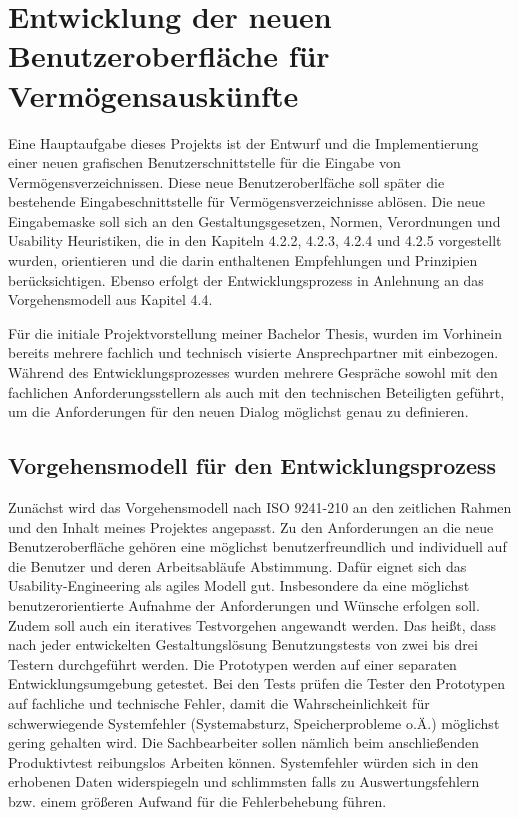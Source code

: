 \section{Entwicklung der neuen Benutzeroberfläche für Vermögensauskünfte}
Eine Hauptaufgabe dieses Projekts ist der Entwurf und die Implementierung einer neuen grafischen Benutzerschnittstelle für die Eingabe von Vermögensverzeichnissen. Diese neue Benutzeroberlfäche soll später die bestehende Eingabeschnittstelle für Vermögensverzeichnisse ablösen. Die neue Eingabemaske soll sich an den Gestaltungsgesetzen, Normen, Verordnungen und Usability Heuristiken, die in den Kapiteln 4.2.2, 4.2.3, 4.2.4 und 4.2.5 vorgestellt wurden, orientieren und die darin enthaltenen Empfehlungen und Prinzipien berücksichtigen. Ebenso erfolgt der Entwicklungsprozess in Anlehnung an das Vorgehensmodell aus Kapitel 4.4. 

Für die initiale Projektvorstellung meiner Bachelor Thesis, wurden im Vorhinein bereits mehrere fachlich und technisch visierte Ansprechpartner mit einbezogen. Während des Entwicklungsprozesses wurden mehrere Gespräche sowohl mit den fachlichen Anforderungsstellern als auch mit den technischen Beteiligten geführt, um die Anforderungen für den neuen Dialog möglichst genau zu definieren.


\subsection{Vorgehensmodell für den Entwicklungsprozess}

Zunächst wird das Vorgehensmodell nach ISO 9241-210 an den zeitlichen Rahmen und den Inhalt meines Projektes angepasst. Zu den Anforderungen an die neue Benutzeroberfläche gehören eine möglichst benutzerfreundlich und individuell auf die Benutzer und deren Arbeitsabläufe Abstimmung. Dafür eignet sich das Usability-Engineering als agiles Modell gut. Insbesondere da eine möglichst benutzerorientierte Aufnahme der Anforderungen und Wünsche erfolgen soll. Zudem soll auch ein iteratives Testvorgehen angewandt werden. Das heißt, dass nach jeder entwickelten Gestaltungslösung Benutzungstests von zwei bis drei Testern durchgeführt werden. Die Prototypen werden auf einer separaten Entwicklungsumgebung getestet. Bei den Tests prüfen die Tester den Prototypen auf fachliche und technische Fehler, damit die Wahrscheinlichkeit für schwerwiegende Systemfehler (Systemabsturz, Speicherprobleme o.Ä.) möglichst gering gehalten wird. Die Sachbearbeiter sollen nämlich beim anschließenden Produktivtest reibungslos Arbeiten können. Systemfehler würden sich in den erhobenen Daten widerspiegeln und schlimmsten falls zu Auswertungsfehlern bzw. einem größeren Aufwand für die Fehlerbehebung führen.

